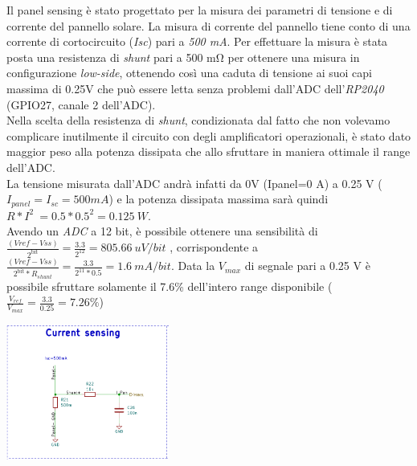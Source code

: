 \noindent Il panel sensing è stato progettato per la misura dei parametri di
tensione e di corrente del pannello solare. La misura di corrente del
pannello tiene conto di una corrente di cortocircuito (\emph{Isc}) pari
a \emph{500 mA}. Per effettuare la misura è stata posta una resistenza
di \textit{shunt} pari a 500 mΩ per ottenere una misura in configurazione \emph{low-side},
ottenendo così una caduta di tensione ai suoi capi massima di 0.25V che
può essere letta senza problemi dall'ADC dell'\textit{RP2040} (GPIO27, canale 2
dell'ADC).\\
Nella scelta della resistenza di \textit{shunt}, condizionata dal fatto che non
volevamo complicare inutilmente il circuito con degli amplificatori
operazionali, è stato dato maggior peso alla potenza dissipata che allo
sfruttare in maniera ottimale il range dell'ADC.\\
La tensione misurata dall'ADC andrà infatti da 0V (Ipanel=0 A) a 0.25 V
($I_{panel}=I_{sc}=500 mA$) e la potenza dissipata massima sarà quindi
\(R*I^{2}\  = 0.5*0.5^{2} = 0.125\ W\).\\
Avendo un \emph{ADC} a 12 bit, è possibile ottenere una sensibilità di
\(\frac{(Vref - Vss)}{2^{\text{bit}}} = \frac{3.3}{2^{12}} = 805.66\ uV/bit\)
, corrispondente a
\(\frac{(Vref - Vss)}{2^{\text{bit}}*R_{shunt}} = \frac{3.3}{2^{11}*0.5} = 1.6\ mA/bit\).
Data la $V_{max}$ di segnale pari a 0.25 V è possibile sfruttare solamente il
7.6\% dell'intero range disponibile
(\(\frac{V_{ref}}{V_{max}} = \frac{3.3}{0.25} = 7.26\%\))

\begin{center}
\includegraphics[width=0.4\textwidth]{figures/image19.png}
\captionsetup{type=figure}
\end{center}

